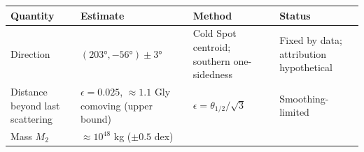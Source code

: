 \documentclass[
]{article}
\begin{document}
\begin{longtable}[]{@{}llll@{}}
\toprule
\begin{minipage}[b]{0.22\columnwidth}\raggedright
Quantity\strut
\end{minipage} & \begin{minipage}[b]{0.22\columnwidth}\raggedright
Estimate\strut
\end{minipage} & \begin{minipage}[b]{0.22\columnwidth}\raggedright
Method\strut
\end{minipage} & \begin{minipage}[b]{0.22\columnwidth}\raggedright
Status\strut
\end{minipage}\tabularnewline
\midrule
\endhead
\begin{minipage}[t]{0.22\columnwidth}\raggedright
Direction\strut
\end{minipage} & \begin{minipage}[t]{0.22\columnwidth}\raggedright
\((203°, -56°) \pm 3°\)\strut
\end{minipage} & \begin{minipage}[t]{0.22\columnwidth}\raggedright
Cold Spot centroid; southern one-sidedness\strut
\end{minipage} & \begin{minipage}[t]{0.22\columnwidth}\raggedright
Fixed by data; attribution hypothetical\strut
\end{minipage}\tabularnewline
\begin{minipage}[t]{0.22\columnwidth}\raggedright
Distance beyond last scattering\strut
\end{minipage} & \begin{minipage}[t]{0.22\columnwidth}\raggedright
\(\epsilon = 0.025\), \(\approx 1.1\) Gly comoving (upper bound)\strut
\end{minipage} & \begin{minipage}[t]{0.22\columnwidth}\raggedright
\(\epsilon = \theta_{1/2}/\sqrt{3}\)\strut
\end{minipage} & \begin{minipage}[t]{0.22\columnwidth}\raggedright
Smoothing-limited\strut
\end{minipage}\tabularnewline
\begin{minipage}[t]{0.22\columnwidth}\raggedright
Mass \(M_2\)\strut
\end{minipage} & \begin{minipage}[t]{0.22\columnwidth}\raggedright
\(\approx 10^{48}\) kg (\(\pm 0.5\) dex)\strut
\end{minipage} & \begin{minipage}[t]{0.22\columnwidth}\raggedright

\end{minipage}
\end{longtable}
\end{document}
